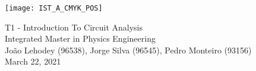 
\thispagestyle {empty}

\texttt{[image: IST\_A\_CMYK\_POS]}

\begin{center}
%
\vspace{1.0cm}

\vspace{1cm}
{\FontLb T1 - Introduction To Circuit Analysis} \\ %
\vspace{1cm}
{\FontSn Integrated Master in Physics Engineering} \\ %
\vspace{1cm}
{\FontSn João Lehodey (96538), Jorge Silva (96545), Pedro Monteiro (93156)} \\
\vspace{1cm}
{\FontSn March 22, 2021} \\ %
%
\end{center}

